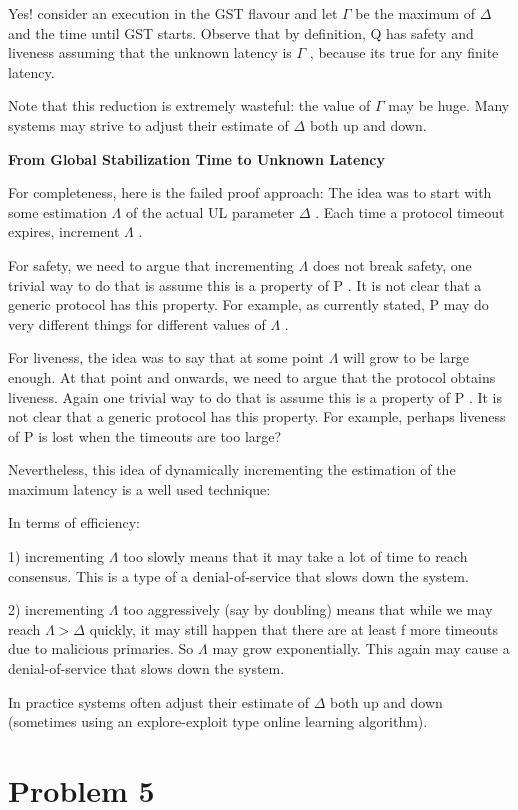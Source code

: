 \documentclass{article}
\begin{document}
Yes! consider an execution in the GST flavour and let $\Gamma$ 
 be the maximum of $\Delta$
 and the time until GST
 starts. Observe that by definition, Q
 has safety and liveness assuming that the unknown latency is $\Gamma$
, because its true for any finite latency.

Note that this reduction is extremely wasteful: the value of $\Gamma$
 may be huge. Many systems may strive to adjust their estimate of $\Delta$
 both up and down.

\textbf{From Global Stabilization Time to Unknown Latency}

For completeness, here is the failed proof approach: The idea was to start with some estimation $\Lambda$
 of the actual UL parameter $\Delta$
. Each time a protocol timeout expires, increment $\Lambda$
.

For safety, we need to argue that incrementing $\Lambda$
 does not break safety, one trivial way to do that is assume this is a property of P
. It is not clear that a generic protocol has this property. For example, as currently stated, P
 may do very different things for different values of $\Lambda$
.

For liveness, the idea was to say that at some point $\Lambda$
 will grow to be large enough. At that point and onwards, we need to argue that the protocol obtains liveness. Again one trivial way to do that is assume this is a property of P
. It is not clear that a generic protocol has this property. For example, perhaps liveness of P
 is lost when the timeouts are too large?

Nevertheless, this idea of dynamically incrementing the estimation of the maximum latency is a well used technique:

In terms of efficiency:

1) incrementing $\Lambda$
 too slowly means that it may take a lot of time to reach consensus. This is a type of a denial-of-service that slows down the system.
 
2) incrementing $\Lambda$
 too aggressively (say by doubling) means that while we may reach $\Lambda > \Delta$
 quickly, it may still happen that there are at least f
 more timeouts due to malicious primaries. So $\Lambda$
 may grow exponentially. This again may cause a denial-of-service that slows down the system.

In practice systems often adjust their estimate of $\Delta$
 both up and down (sometimes using an explore-exploit type online learning algorithm).


\section*{Problem 5}
\end{document}
